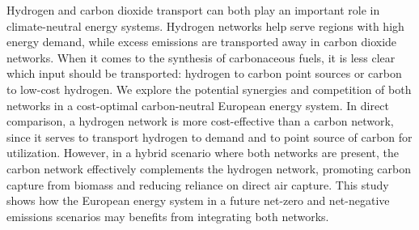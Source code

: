 Hydrogen and carbon dioxide transport can both play an important role in climate-neutral energy systems. Hydrogen networks help serve regions with high energy demand, while excess emissions are transported away in carbon dioxide networks. When it comes to the synthesis of carbonaceous fuels, it is less clear which input should be transported: hydrogen to carbon point sources or carbon to low-cost hydrogen. We explore the potential synergies and competition of both networks in a cost-optimal carbon-neutral European energy system. In direct comparison, a hydrogen network is more cost-effective than a carbon network, since it serves to transport hydrogen to demand and to point source of carbon for utilization. However, in a hybrid scenario where both networks are present, the carbon network effectively complements the hydrogen network, promoting carbon capture from biomass and reducing reliance on direct air capture. This study shows how the European energy system in a future net-zero and net-negative emissions scenarios may benefits from integrating both networks.
